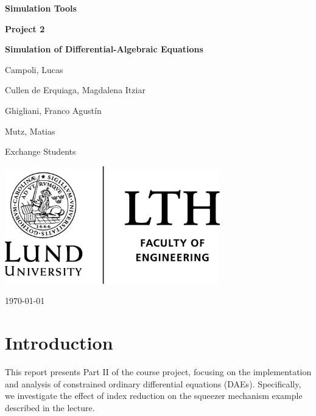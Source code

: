\documentclass{article}
\begin{document}
\begin{titlepage}
    \centering
    \vspace*{1.5cm}
    {\LARGE\bfseries Simulation Tools\par}
    \vspace*{0.5cm}
    {\LARGE\bfseries Project 2\par}
    \vspace*{0.5cm}
    {\LARGE\bfseries Simulation of Differential-Algebraic Equations\par}
    \vspace{1cm}
    {\Large Campoli, Lucas\par}
    \vspace{0.5cm}
    {\Large Cullen de Erquiaga, Magdalena Itziar\par}
    \vspace{0.5cm}
    {\Large Ghigliani, Franco Agustín\par}
    \vspace{0.5cm}
    {\Large Mutz, Matias\par}
    \vspace{1cm}
    {\large Exchange Students\par}
    \vspace{2cm}
    \includegraphics[width=0.7\textwidth]{lth.png}
    \vfill
    {\large \today\par}
\end{titlepage}

\tableofcontents
\newpage

\section*{Introduction}
\indent

This report presents Part II of the course project, focusing on the implementation and analysis of constrained ordinary differential equations (DAEs). Specifically, we investigate the effect of index reduction on the squeezer mechanism example described in the lecture.
\end{document}
